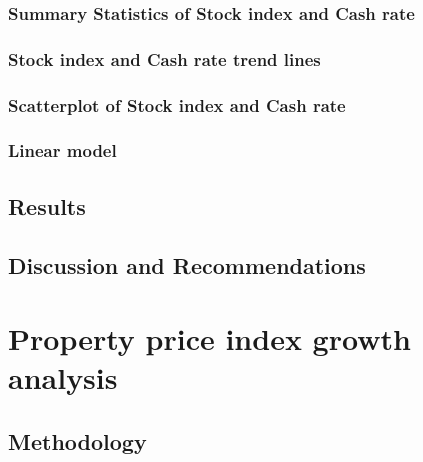 \documentclass[11pt,a4paper,]{article}
\begin{document}
\hypertarget{summary-statistics-of-stock-index-and-cash-rate}{%
\subsubsection{Summary Statistics of Stock index and Cash rate}\label{summary-statistics-of-stock-index-and-cash-rate}}

\hypertarget{stock-index-and-cash-rate-trend-lines}{%
\subsubsection{Stock index and Cash rate trend lines}\label{stock-index-and-cash-rate-trend-lines}}

\hypertarget{scatterplot-of-stock-index-and-cash-rate}{%
\subsubsection{Scatterplot of Stock index and Cash rate}\label{scatterplot-of-stock-index-and-cash-rate}}

\hypertarget{linear-model-1}{%
\subsubsection{Linear model}\label{linear-model-1}}

\hypertarget{results-2}{%
\subsection{Results}\label{results-2}}

\hypertarget{discussion-and-recommendations-2}{%
\subsection{Discussion and Recommendations}\label{discussion-and-recommendations-2}}

\hypertarget{property-price-index-growth-analysis}{%
\section{Property price index growth analysis}\label{property-price-index-growth-analysis}}

\hypertarget{methodology-3}{%
\subsection{Methodology}\label{methodology-3}}
\end{document}
